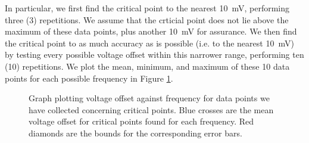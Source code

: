 In particular, we first find the critical point to the nearest 10~mV, performing
three (3) repetitions. We assume that the crticial point does not lie above the
maximum of these data points, plus another 10~mV for assurance. We then find the
critical point to as much accuracy as is possible (i.e. to the nearest 10~mV)
by testing every possible voltage offset within this narrower range, performing
ten (10) repetitions. We plot the mean, minimum, and maximum of these 10 data
points for each possible frequency in Figure \ref{fig:critical-points-graph}.

\begin{figure}[!htb]
    \caption{
        \label{fig:critical-points-graph}
        Graph plotting voltage offset against frequency for data points we have
        collected concerning critical points. Blue crosses are the mean voltage
        offset for critical points found for each frequency. Red diamonds are
        the bounds for the corresponding error bars.
    }
\end{figure}
